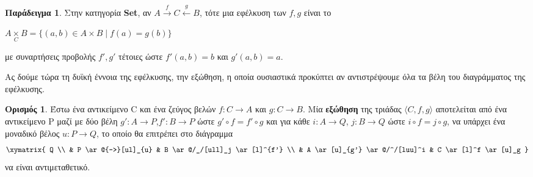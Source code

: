 \documentclass [a4paper,11pt] {book}
\theoremstyle{definition}
\newtheorem{example}[theorem]{Παράδειγμα}
\theoremstyle{definition}
\newtheorem{definition}[theorem]{Ορισμός}
\begin{document}
\begin{example}
Στην κατηγορία \textbf{Set}, αν $A\xrightarrow{f}C \xleftarrow{g}B$, τότε μια εφέλκυση των $f,g$ είναι το
\begin{center}
$A\underset{C}{\times} B= \{(a, b) \in A \times B\mid f(a) = g(b)\}$
\end{center}
με συναρτήσεις προβολής $f',g'$ τέτοιες ώστε
$f'(a,b)=b$ και $g'(a,b)=a$.
\end{example}
Ας δούμε τώρα τη δυϊκή έννοια της εφέλκυσης, την εξώθηση, η οποία ουσιαστικά προκύπτει αν αντιστρέψουμε όλα τα βέλη του διαγράμματος της εφέλκυσης.
\begin{definition}\label{pushout}
Έστω ένα αντικείμενο C και ένα ζεύγος βελών $f:C \to A$ και $g: C\to B$. Μία \textbf{εξώθηση} της τριάδας $\langle C,f,g \rangle$ αποτελείται από ένα αντικείμενο P μαζί με δύο βέλη  $g':A \to P$,$f': B\to P$ ώστε $g' \circ f=f' \circ g$ και για κάθε $i:A \to Q$, $j:B \to Q$ ώστε $i \circ f = j \circ g$, να υπάρχει ένα μοναδικό βέλος $u: P \to Q$, το οποίο θα επιτρέπει στο διάγραμμα
\begin{displaymath}
\xymatrix{
Q \\
& P \ar@{-->}[ul]_{u} & B \ar@/_/[ull]_j \ar[l]^{f'} \\
& A \ar[u]_{g'} \ar@/^/[luu]^i & C \ar[l]^f \ar[u]_g
	}
\end{displaymath}
να είναι αντιμεταθετικό.
\end{definition}
\end{document}

